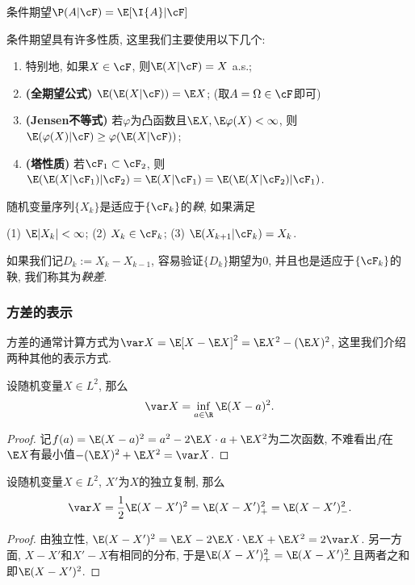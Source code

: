 条件期望$\P(A | \cF) = \E[\I{A} | \cF]$

条件期望具有许多性质, 这里我们主要使用以下几个: 
	\begin{enumerate}[label=(\roman*)]
		\item 特别地, 如果$X \in \cF$, 则$\E(X|\cF) = X$ a.s.;
		\item \textbf{(全期望公式)} $\E(\E(X|\cF)) = \E X$; (取$A = \Omega \in \cF$即可)
		\item \textbf{(Jensen不等式)} 若$\varphi$为凸函数且$\E X, \E \varphi(X) < \infty$, 则$\E(\varphi(X) | \cF) \geq \varphi(\E(X|\cF))$; 
		\item \textbf{(塔性质)} 若$\cF_1 \subset \cF_2$, 则$\E(\E(X|\cF_1)|\cF_2) = \E(X|\cF_1) = \E(\E(X|\cF_2)|\cF_1)$. 
	\end{enumerate}
随机变量序列$\{X_k\}$是适应于$\{\cF_k\}$的\emph{鞅}, 如果满足
\begin{center}
	(1) $\E |X_k| < \infty$; \quad
	(2) $X_k \in \cF_k$; \quad
	(3) $\E(X_{k+1}|\cF_k) = X_k$.
\end{center}
如果我们记$D_k := X_k - X_{k-1}$, 容易验证$\{D_k\}$期望为$0$, 并且也是适应于$\{\cF_k\}$的鞅, 我们称其为\emph{鞅差}. 

\subsubsection{方差的表示}

方差的通常计算方式为$\var X = \E[X - \E X]^2 = \E X^2 - (\E X)^2$, 这里我们介绍两种其他的表示方式. 

\begin{lemma}[方差的变分表示]
	设随机变量$X \in L^2$, 那么
	\begin{equation*}
		\var X = \inf_{a \in \R} \E (X - a)^2. 
	\end{equation*}
\end{lemma}
\begin{proof}
	记$f(a) =  \E (X - a)^2 = a^2 - 2 \E X \cdot a + \E X^2$为二次函数, 不难看出$f$在$\E X$有最小值$- (\E X)^2 + \E X^2 = \var X$. 
\end{proof}

\begin{lemma}[独立复制]
	设随机变量$X \in L^2$, $X'$为$X$的独立复制, 那么
	\begin{equation*}
		\var X = \frac12 \E (X - X')^2
		= \E (X - X')_+^2 = \E (X - X')_-^2. 
	\end{equation*}
\end{lemma}
\begin{proof}
	由独立性, $\E (X - X')^2 = \E X - 2 \E X \cdot \E X + \E X^2 = 2 \var X$. 
	另一方面, $X - X'$和$X' - X$有相同的分布, 于是$\E(X - X')_+^2 = \E(X - X')_-^2$且两者之和即$\E (X - X')^2$. 
\end{proof}

